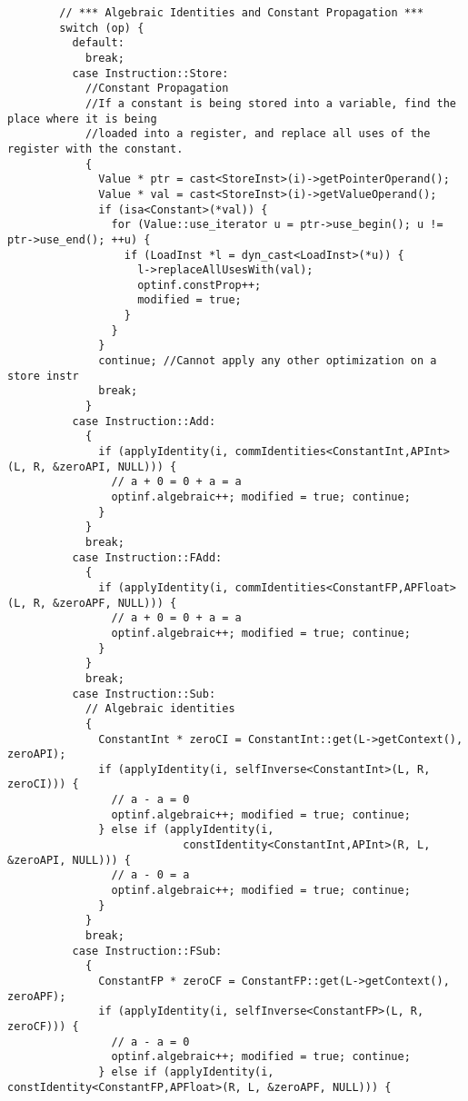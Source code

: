 \documentclass[12pt]{article}
\begin{document}
\begin{verbatim}
        // *** Algebraic Identities and Constant Propagation ***
        switch (op) {
          default:
            break;
          case Instruction::Store:
            //Constant Propagation
            //If a constant is being stored into a variable, find the place where it is being 
            //loaded into a register, and replace all uses of the register with the constant.
            {
              Value * ptr = cast<StoreInst>(i)->getPointerOperand();
              Value * val = cast<StoreInst>(i)->getValueOperand();
              if (isa<Constant>(*val)) {
                for (Value::use_iterator u = ptr->use_begin(); u != ptr->use_end(); ++u) {
                  if (LoadInst *l = dyn_cast<LoadInst>(*u)) {
                    l->replaceAllUsesWith(val);
                    optinf.constProp++;
                    modified = true;
                  }
                }
              }
              continue; //Cannot apply any other optimization on a store instr
              break;
            }
          case Instruction::Add:
            {
              if (applyIdentity(i, commIdentities<ConstantInt,APInt>(L, R, &zeroAPI, NULL))) {
                // a + 0 = 0 + a = a
                optinf.algebraic++; modified = true; continue;
              }
            }
            break;
          case Instruction::FAdd:
            {
              if (applyIdentity(i, commIdentities<ConstantFP,APFloat>(L, R, &zeroAPF, NULL))) {
                // a + 0 = 0 + a = a
                optinf.algebraic++; modified = true; continue;
              }
            }
            break;
          case Instruction::Sub:
            // Algebraic identities
            {
              ConstantInt * zeroCI = ConstantInt::get(L->getContext(), zeroAPI);
              if (applyIdentity(i, selfInverse<ConstantInt>(L, R, zeroCI))) {
                // a - a = 0
                optinf.algebraic++; modified = true; continue;
              } else if (applyIdentity(i, 
                           constIdentity<ConstantInt,APInt>(R, L, &zeroAPI, NULL))) {
                // a - 0 = a
                optinf.algebraic++; modified = true; continue;
              }
            }
            break;
          case Instruction::FSub:
            {
              ConstantFP * zeroCF = ConstantFP::get(L->getContext(), zeroAPF);
              if (applyIdentity(i, selfInverse<ConstantFP>(L, R, zeroCF))) {
                // a - a = 0
                optinf.algebraic++; modified = true; continue;
              } else if (applyIdentity(i, constIdentity<ConstantFP,APFloat>(R, L, &zeroAPF, NULL))) {

\end{verbatim}
\end{document}
